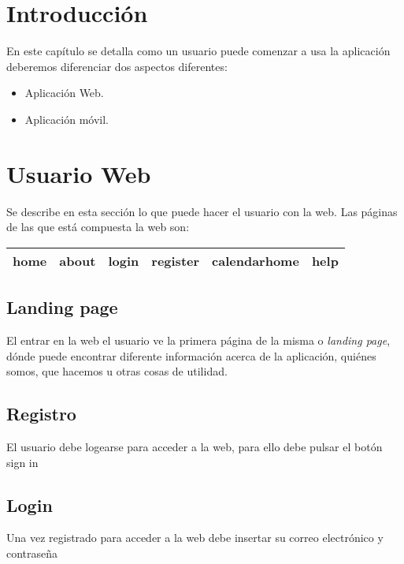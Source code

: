 
\section{Introducción}\label{introduccion-usuario}
En este capítulo se detalla como un usuario puede comenzar a usa la aplicación 
deberemos diferenciar dos aspectos diferentes:

\begin{itemize}
\tightlist
\item
  Aplicación Web. 
\item
  Aplicación móvil. 
\end{itemize}

\section{Usuario Web}
Se describe en esta sección lo que puede hacer el usuario con la web.  Las páginas de las que está compuesta la web son:

\begin{tabular}{|c|c|c|c|c|c|}
  \hline
   home & about & login & register & calendarhome & help  \\
  \hline
\end{tabular}

\subsection{Landing page}
El entrar en la web el usuario ve la primera página de la misma o \emph{landing page}, dónde puede encontrar diferente información acerca de la aplicación, quiénes somos, que hacemos u otras cosas de utilidad.


\subsection{Registro}

El usuario debe logearse para acceder a la web, para ello debe pulsar el botón sign in




\subsection{Login}

Una vez registrado para acceder a la web debe insertar su correo electrónico y contraseña

